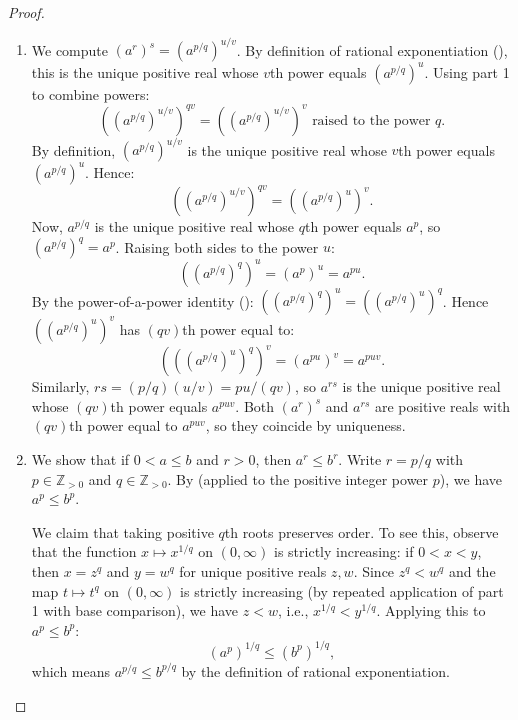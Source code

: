\begin{proof}
\begin{enumerate}
    \item We compute $\left(a^r\right)^s = (a^{p/q})^{u/v}$. By definition of rational exponentiation (), this is the unique positive real whose $v$th power equals $\left(a^{p/q}\right)^u$. Using part 1 to combine powers:
    $$\left(\left(a^{p/q}\right)^{u/v}\right)^{qv} = \left(\left(a^{p/q}\right)^{u/v}\right)^v \text{ raised to the power } q.$$
    By definition, $\left(a^{p/q}\right)^{u/v}$ is the unique positive real whose $v$th power equals $\left(a^{p/q}\right)^u$. Hence:
    $$\left(\left(a^{p/q}\right)^{u/v}\right)^{qv} = \left(\left(a^{p/q}\right)^u\right)^v.$$
    Now, $a^{p/q}$ is the unique positive real whose $q$th power equals $a^p$, so $\left(a^{p/q}\right)^q = a^p$. Raising both sides to the power $u$:
    $$\left(\left(a^{p/q}\right)^q\right)^u = (a^p)^u = a^{pu}.$$
    By the power-of-a-power identity (): $\left(\left(a^{p/q}\right)^q\right)^u = \left(\left(a^{p/q}\right)^u\right)^q$. Hence $\left(\left(a^{p/q}\right)^u\right)^v$ has $(qv)$th power equal to:
    $$\left(\left(\left(a^{p/q}\right)^u\right)^q\right)^v = \left(a^{pu}\right)^v = a^{puv}.$$
    Similarly, $rs = (p/q)(u/v) = pu/(qv)$, so $a^{rs}$ is the unique positive real whose $(qv)$th power equals $a^{puv}$. Both $\left(a^r\right)^s$ and $a^{rs}$ are positive reals with $(qv)$th power equal to $a^{puv}$, so they coincide by uniqueness.

    \item We show that if $0 < a \leq b$ and $r > 0$, then $a^r \leq b^r$. Write $r = p/q$ with $p \in \mathbb{Z}_{>0}$ and $q \in \mathbb{Z}_{>0}$. By  (applied to the positive integer power $p$), we have $a^p \leq b^p$.

    We claim that taking positive $q$th roots preserves order. To see this, observe that the function $x \mapsto x^{1/q}$ on $(0,\infty)$ is strictly increasing: if $0 < x < y$, then $x = z^q$ and $y = w^q$ for unique positive reals $z,w$. Since $z^q < w^q$ and the map $t \mapsto t^q$ on $(0,\infty)$ is strictly increasing (by repeated application of part 1 with base comparison), we have $z < w$, i.e., $x^{1/q} < y^{1/q}$. Applying this to $a^p \leq b^p$:
    $$\left(a^p\right)^{1/q} \leq \left(b^p\right)^{1/q},$$
    which means $a^{p/q} \leq b^{p/q}$ by the definition of rational exponentiation.


\end{enumerate}
\end{proof}
